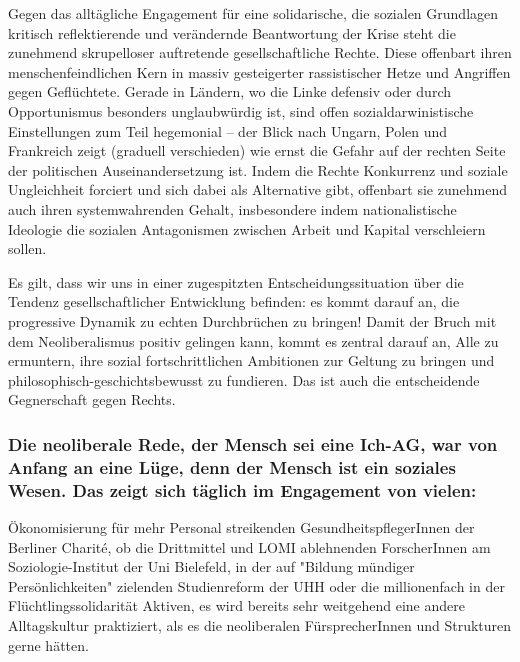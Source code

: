 \documentclass[ngerman,headheight=70pt]{scrartcl}
\begin{document}
    Gegen das alltägliche Engagement für eine solidarische, die sozialen
    Grundlagen kritisch reflektierende und verändernde Beantwortung der Krise
    steht die zunehmend skrupelloser auftretende gesellschaftliche Rechte. Diese
    offenbart ihren menschenfeindlichen Kern in massiv gesteigerter
    rassistischer Hetze und Angriffen gegen Geflüchtete. Gerade in Ländern, wo
    die Linke defensiv oder durch Opportunismus besonders unglaubwürdig ist,
    sind offen sozialdarwinistische Einstellungen zum Teil hegemonial -- der
    Blick nach Ungarn, Polen und Frankreich zeigt (graduell verschieden) wie
    ernst die Gefahr auf der rechten Seite der politischen Auseinandersetzung
    ist. Indem die Rechte Konkurrenz und soziale Ungleichheit forciert und sich
    dabei als Alternative gibt, offenbart sie zunehmend auch ihren systemwahrenden
    Gehalt, insbesondere indem nationalistische Ideologie die sozialen
    Antagonismen zwischen Arbeit und Kapital verschleiern sollen.

    Es gilt, dass wir uns in einer zugespitzten Entscheidungssituation über die
    Tendenz gesellschaftlicher Entwicklung befinden: es kommt darauf an, die
    progressive Dynamik zu echten Durchbrüchen zu bringen! Damit der Bruch mit
    dem Neoliberalismus positiv gelingen kann, kommt es zentral darauf an, Alle
    zu ermuntern, ihre sozial fortschrittlichen Ambitionen zur Geltung zu bringen
    und philosophisch-geschichtsbewusst zu fundieren. Das ist auch die
    entscheidende Gegnerschaft gegen Rechts.

    \subsubsection{Die neoliberale Rede, der Mensch sei eine Ich-AG, war von
    Anfang an eine Lüge, denn der Mensch ist ein soziales Wesen. Das zeigt sich
    täglich im Engagement von vielen:}

    Ökonomisierung für mehr Personal streikenden GesundheitspflegerInnen der
    Berliner Charité, ob die Drittmittel und LOMI ablehnenden ForscherInnen am
    Soziologie-Institut der Uni Bielefeld, in der auf "Bildung mündiger
    Persönlichkeiten" zielenden Studienreform der UHH oder die millionenfach in
    der Flüchtlingssolidarität Aktiven, es wird bereits sehr weitgehend eine
    andere Alltagskultur praktiziert, als es die neoliberalen FürsprecherInnen
    und Strukturen gerne hätten.
\end{document}
